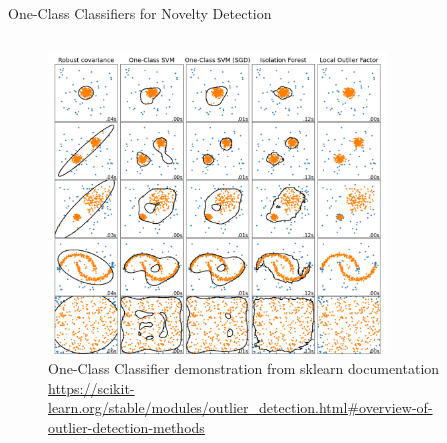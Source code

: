 \documentclass[aspectratio=169, 8pt]{beamer}
\begin{document}
\begin{frame}{One-Class Classifiers for Novelty Detection}
\begin{columns}[T]
    \begin{column}{0.5\linewidth}
        \begin{figure}
            \centering
            \includegraphics[width = 0.8\textwidth]{images/oc.png}
            \caption{One-Class Classifier demonstration from sklearn documentation \url{https://scikit-learn.org/stable/modules/outlier_detection.html#overview-of-outlier-detection-methods} }
            \label{fig:enter-label}
        \end{figure}
    \end{column}
\end{columns}

\end{frame}
\end{document}
